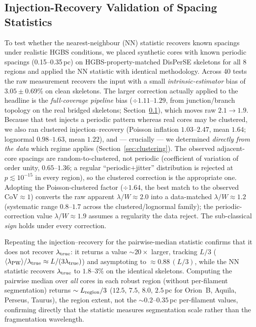 \documentclass[usenatbib,twoside,twocolumn]{mnras}
\begin{document}
\subsection{Injection-Recovery Validation of Spacing Statistics}
\label{sec:injection_recovery}

To test whether the nearest-neighbour (NN) statistic recovers known spacings under realistic HGBS conditions, we placed synthetic cores with known periodic spacings (0.15--0.35\,pc) on HGBS-property-matched DisPerSE skeletons for all 8 regions and applied the NN statistic with identical methodology. Across 40 tests the raw measurement recovers the input with a small \emph{intrinsic-estimator} bias of $3.05 \pm 0.69$\% on clean skeletons. The larger correction actually applied to the headline is the \emph{full-coverage pipeline} bias ($\div1.11$--$1.29$, from junction/branch topology on the real bridged skeletons; Section~\ref{sec:injection_recovery}), which moves raw $2.1\to1.9$. Because that test injects a periodic pattern whereas real cores may be clustered, we also ran clustered injection--recovery (Poisson inflation $1.03$--$2.47$, mean $1.64$; lognormal $0.98$--$1.63$, mean $1.22$), and --- crucially --- we determined \emph{directly from the data} which regime applies (Section~\ref{sec:clustering}). The observed adjacent-core spacings are random-to-clustered, not periodic (coefficient of variation of order unity, $0.65$--$1.36$; a regular ``periodic$+$jitter'' distribution is rejected at $p\lesssim10^{-15}$ in every region), so the clustered correction is the appropriate one. Adopting the Poisson-clustered factor ($\div1.64$, the best match to the observed CoV$\approx1$) converts the raw apparent $\lambda/W\approx2.0$ into a data-matched $\lambda/W\approx1.2$ (systematic range $0.8$--$1.7$ across the clustered/lognormal family); the periodic-correction value $\lambda/W\approx1.9$ assumes a regularity the data reject. The sub-classical \emph{sign} holds under every correction.

Repeating the injection--recovery for the pairwise-median statistic confirms that it does not recover $\lambda_{\rm true}$: it returns a value $\sim$$20\times$ larger, tracking $L/3$ ($\langle\lambda_{\rm PW}\rangle/\lambda_{\rm true}\approx L/(3\lambda_{\rm true})$) and asymptoting to $\approx0.88\,(L/3)$, while the NN statistic recovers $\lambda_{\rm true}$ to $1.8$--$3\%$ on the identical skeletons. Computing the pairwise median over \emph{all} cores in each robust region (without per-filament segmentation) returns $\sim L_{\rm region}/3$ ($12.5$, $7.5$, $8.0$, $2.5$\,pc for Orion~B, Aquila, Perseus, Taurus), the region extent, not the $\sim0.2$--$0.35$\,pc per-filament values, confirming directly that the statistic measures segmentation scale rather than the fragmentation wavelength.
\end{document}
